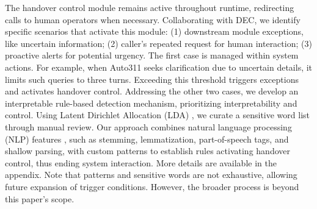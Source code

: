 The handover control module remains active throughout runtime, redirecting calls to human operators when necessary. Collaborating with DEC, we identify specific scenarios that activate this module: (1) downstream module exceptions, like uncertain information; (2) caller's repeated request for human interaction; (3) proactive alerts for potential urgency. The first case is managed within system actions. For example, when Auto311 seeks clarification due to uncertain details, it limits such queries to three turns. Exceeding this threshold triggers exceptions and activates handover control. Addressing the other two cases, we develop an interpretable rule-based detection mechanism, prioritizing interpretability and control. Using Latent Dirichlet Allocation (LDA) \cite{blei2003latent}, we curate a sensitive word list through manual review. Our approach combines natural language processing (NLP) features \cite{nltk}, such as stemming, lemmatization, part-of-speech tags, and shallow parsing, with custom patterns to establish rules activating handover control, thus ending system interaction. More details are available in the appendix. Note that patterns and sensitive words are not exhaustive, allowing future expansion of trigger conditions. However, the broader process is beyond this paper's scope.


